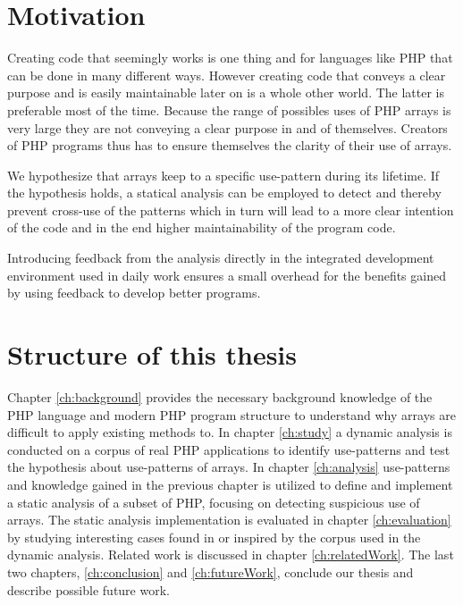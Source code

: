 \section{Motivation}
Creating code that seemingly works is one thing and for languages like PHP that can be done in many different ways. However creating code that conveys a clear purpose and is easily maintainable later on is a whole other world. The latter is preferable most of the time. Because the range of possibles uses of PHP arrays is very large they are not conveying a clear purpose in and of themselves. Creators of PHP programs thus has to ensure themselves the clarity of their use of arrays. 

We hypothesize that arrays keep to a specific use-pattern during its lifetime. If the hypothesis holds, a statical analysis can be employed to detect and thereby prevent cross-use of the patterns which in turn will lead to a more clear intention of the code and in the end higher maintainability of the program code.

Introducing feedback from the analysis directly in the integrated development environment used in daily work ensures a small overhead for the benefits gained by using feedback to develop better programs.

\section{Structure of this thesis}
Chapter \ref{ch:background} provides the necessary background knowledge of the PHP language and modern PHP program structure to understand why arrays are difficult to apply existing methods to. In chapter \ref{ch:study} a dynamic analysis is conducted on a corpus of real PHP applications to identify use-patterns and test the hypothesis about use-patterns of arrays. In chapter \ref{ch:analysis} use-patterns and knowledge gained in the previous chapter is utilized to define and implement a static analysis of a subset of PHP, focusing on detecting suspicious use of arrays. The static analysis implementation is evaluated in chapter \ref{ch:evaluation} by studying interesting cases found in or inspired by the corpus used in the dynamic analysis. Related work is discussed in chapter \ref{ch:relatedWork}. The last two chapters, \ref{ch:conclusion} and \ref{ch:futureWork}, conclude our thesis and describe possible future work.
